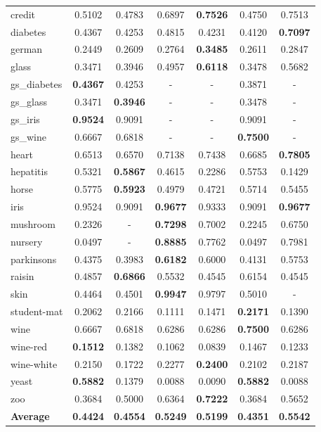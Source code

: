 \documentclass[11pt,a4paper]{article}
\begin{document}
\begin{longtable}{lcccccc}
credit & 0.5102 & 0.4783 & 0.6897 & \textbf{0.7526} & 0.4750 & 0.7513 \\
diabetes & 0.4367 & 0.4253 & 0.4815 & 0.4231 & 0.4120 & \textbf{0.7097} \\
german & 0.2449 & 0.2609 & 0.2764 & \textbf{0.3485} & 0.2611 & 0.2847 \\
glass & 0.3471 & 0.3946 & 0.4957 & \textbf{0.6118} & 0.3478 & 0.5682 \\
gs\_diabetes & \textbf{0.4367} & 0.4253 & - & - & 0.3871 & - \\
gs\_glass & 0.3471 & \textbf{0.3946} & - & - & 0.3478 & - \\
gs\_iris & \textbf{0.9524} & 0.9091 & - & - & 0.9091 & - \\
gs\_wine & 0.6667 & 0.6818 & - & - & \textbf{0.7500} & - \\
heart & 0.6513 & 0.6570 & 0.7138 & 0.7438 & 0.6685 & \textbf{0.7805} \\
hepatitis & 0.5321 & \textbf{0.5867} & 0.4615 & 0.2286 & 0.5753 & 0.1429 \\
horse & 0.5775 & \textbf{0.5923} & 0.4979 & 0.4721 & 0.5714 & 0.5455 \\
iris & 0.9524 & 0.9091 & \textbf{0.9677} & 0.9333 & 0.9091 & \textbf{0.9677} \\
mushroom & 0.2326 & - & \textbf{0.7298} & 0.7002 & 0.2245 & 0.6750 \\
nursery & 0.0497 & - & \textbf{0.8885} & 0.7762 & 0.0497 & 0.7981 \\
parkinsons & 0.4375 & 0.3983 & \textbf{0.6182} & 0.6000 & 0.4131 & 0.5753 \\
raisin & 0.4857 & \textbf{0.6866} & 0.5532 & 0.4545 & 0.6154 & 0.4545 \\
skin & 0.4464 & 0.4501 & \textbf{0.9947} & 0.9797 & 0.5010 & - \\
student-mat & 0.2062 & 0.2166 & 0.1111 & 0.1471 & \textbf{0.2171} & 0.1390 \\
wine & 0.6667 & 0.6818 & 0.6286 & 0.6286 & \textbf{0.7500} & 0.6286 \\
wine-red & \textbf{0.1512} & 0.1382 & 0.1062 & 0.0839 & 0.1467 & 0.1233 \\
wine-white & 0.2150 & 0.1722 & 0.2277 & \textbf{0.2400} & 0.2102 & 0.2187 \\
yeast & \textbf{0.5882} & 0.1379 & 0.0088 & 0.0090 & \textbf{0.5882} & 0.0088 \\
zoo & 0.3684 & 0.5000 & 0.6364 & \textbf{0.7222} & 0.3684 & 0.5652 \\
\midrule \textbf{Average} & \textbf{0.4424} & \textbf{0.4554} & \textbf{0.5249} & \textbf{0.5199} & \textbf{0.4351} & \textbf{0.5542} \\
\bottomrule\end{longtable}
\end{document}
